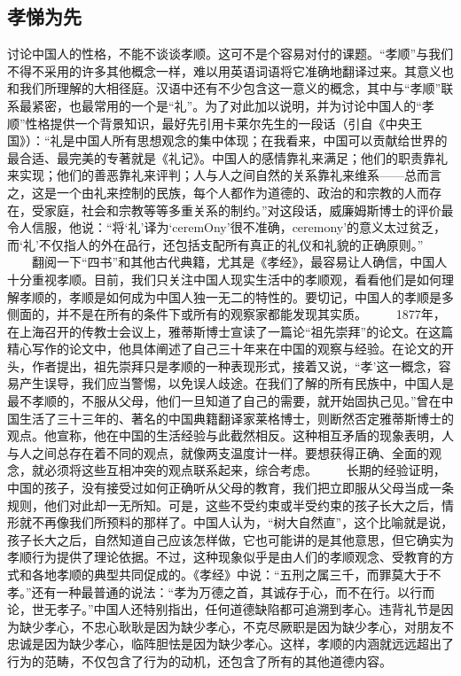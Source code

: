 \documentclass[12pt,oneside]{book}
\begin{document}
\begin{common-format}
\chapter{孝悌为先}
讨论中国人的性格，不能不谈谈孝顺。这可不是个容易对付的课题。“孝顺”与我们不得不采用的许多其他概念一样，难以用英语词语将它准确地翻译过来。其意义也和我们所理解的大相径庭。汉语中还有不少包含这一意义的概念，其中与“孝顺”联系最紧密，也最常用的一个是“礼”。为了对此加以说明，并为讨论中国人的“孝顺”性格提供一个背景知识，最好先引用卡莱尔先生的一段话（引自《中央王国》）：“礼是中国人所有思想观念的集中体现；在我看来，中国可以贡献给世界的最合适、最完美的专著就是《礼记》。中国人的感情靠礼来满足；他们的职责靠礼来实现；他们的善恶靠礼来评判；人与人之间自然的关系靠礼来维系——总而言之，这是一个由礼来控制的民族，每个人都作为道德的、政治的和宗教的人而存在，受家庭，社会和宗教等等多重关系的制约。”对这段话，威廉姆斯博士的评价最令人信服，他说：“将‘礼’译为‘ceremOny’很不准确，ceremony’的意义太过贫乏，而‘礼’不仅指人的外在品行，还包括支配所有真正的礼仪和礼貌的正确原则。” 
　　翻阅一下“四书”和其他古代典籍，尤其是《孝经》，最容易让人确信，中国人十分重视孝顺。目前，我们只关注中国人现实生活中的孝顺观，看看他们是如何理解孝顺的，孝顺是如何成为中国人独一无二的特性的。要切记，中国人的孝顺是多侧面的，并不是在所有的条件下或所有的观察家都能发现其实质。 
　　1877年，在上海召开的传教士会议上，雅蒂斯博士宣读了一篇论“祖先崇拜”的论文。在这篇精心写作的论文中，他具体阐述了自己三十年来在中国的观察与经验。在论文的开头，作者提出，祖先崇拜只是孝顺的一种表现形式，接着又说，“孝’这一概念，容易产生误导，我们应当警惕，以免误人歧途。在我们了解的所有民族中，中国人是最不孝顺的，不服从父母，他们一旦知道了自己的需要，就开始固执己见。”曾在中国生活了三十三年的、著名的中国典籍翻译家莱格博士，则断然否定雅蒂斯博士的观点。他宣称，他在中国的生活经验与此截然相反。这种相互矛盾的现象表明，人与人之间总存在着不同的观点，就像两支温度计一样。要想获得正确、全面的观念，就必须将这些互相冲突的观点联系起来，综合考虑。 
　　长期的经验证明，中国的孩子，没有接受过如何正确听从父母的教育，我们把立即服从父母当成一条规则，他们对此却一无所知。可是，这些不受约束或半受约束的孩子长大之后，情形就不再像我们所预料的那样了。中国人认为，“树大自然直”，这个比喻就是说，孩子长大之后，自然知道自己应该怎样做，它也可能讲的是其他意思，但它确实为孝顺行为提供了理论依据。不过，这种现象似乎是由人们的孝顺观念、受教育的方式和各地孝顺的典型共同促成的。《孝经》中说：“五刑之属三千，而罪莫大于不孝。”还有一种最普通的说法：“孝为万德之首，其诚存于心，而不在行。以行而论，世无孝子。”中国人还特别指出，任何道德缺陷都可追溯到孝心。违背礼节是因为缺少孝心，不忠心耿耿是因为缺少孝心，不克尽厥职是因为缺少孝心，对朋友不忠诚是因为缺少孝心，临阵胆怯是因为缺少孝心。这样，孝顺的内涵就远远超出了行为的范畴，不仅包含了行为的动机，还包含了所有的其他道德内容。 

\end{common-format}
\end{document}

